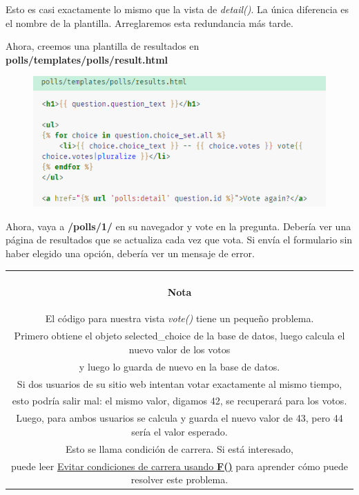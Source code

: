 \documentclass[10pt]{article}
\begin{document}
Esto es casi exactamente lo mismo que la vista de \textit{detail()}. La única diferencia es el nombre de la plantilla. Arreglaremos esta redundancia más tarde.

Ahora, creemos una plantilla de resultados en \textbf{polls/templates/polls/result.html} 

\begin{figure}[H]
\begin{center}
\includegraphics[scale=0.9]{figuras/3/34/341/img6.png}
\end{center}
\end{figure}


Ahora, vaya a \textbf{/polls/1/} en su navegador y vote en la pregunta. Debería ver una página de resultados que se actualiza cada vez que vota. Si envía el formulario sin haber elegido una opción, debería ver un mensaje de error.

\begin{small}
\begin{table}[H]
	\begin{tabular}{||c||}
	\hline \\
	\begin{Large}
	\textbf{Nota}
	\end{Large}
	\\	
El código para nuestra vista \textit{vote()} tiene un pequeño problema.\\ Primero obtiene el objeto \textcolor{G}{selected\_choice} de la base de datos, luego calcula el nuevo valor de los votos\\ y luego lo guarda de nuevo en la base de datos.\\ Si dos usuarios de su sitio web intentan votar exactamente al mismo tiempo,\\ esto podría salir mal: el mismo valor, digamos 42, se recuperará para los votos.\\ Luego, para ambos usuarios se calcula y guarda el nuevo valor de 43, pero 44 sería el valor esperado.\\

Esto se llama condición de carrera. Si está interesado,\\ puede leer {\href{https://docs.djangoproject.com/en/3.0/ref/models/expressions/#avoiding-race-conditions-using-f}{\textcolor{B}{Evitar condiciones de carrera usando \textbf{F()}}}} para aprender cómo puede resolver este problema.
\\ \hline 	
			\end{tabular}			
		\end{table}		
\end{small}
\end{document}
